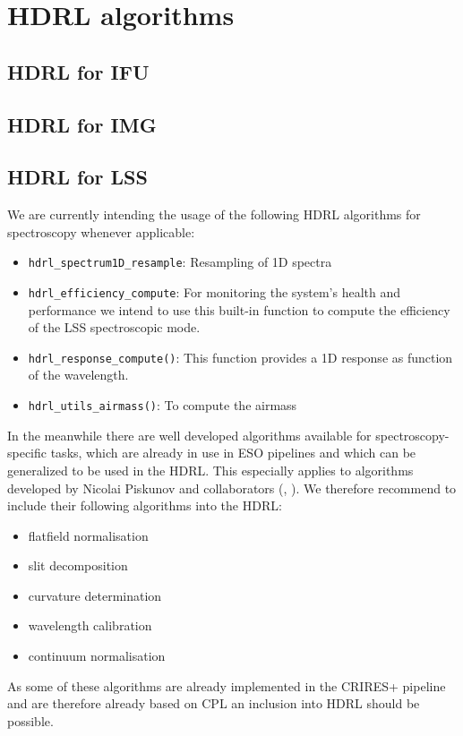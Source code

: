 \clearpage
\section{HDRL algorithms}\label{sec:hdrl_algorithms}
\subsection{HDRL for IFU}\label{ssec:hdrllms}


\subsection{HDRL for IMG}\label{ssec:hdrlimg}



\subsection{HDRL for LSS}\label{ssec:hdrllss}
We are currently intending the usage of the following \ac{HDRL} algorithms for spectroscopy whenever applicable:
\begin{itemize}
    \item \texttt{hdrl\_spectrum1D\_resample}: Resampling of 1D spectra
    \item \texttt{hdrl\_efficiency\_compute}: For monitoring the system's health and performance we intend to use this built-in function to compute the efficiency of the \ac{LSS} spectroscopic mode.
    \item \texttt{hdrl\_response\_compute()}: This function provides a 1D response as function of the wavelength. 
    \item \texttt{hdrl\_utils\_airmass()}: To compute the airmass
\end{itemize}

In the meanwhile there are well developed algorithms available for spectroscopy-specific tasks, which are already in use in ESO pipelines and which can be generalized to be used in the \ac{HDRL}. This especially applies to algorithms developed by Nicolai Piskunov and collaborators (\cite{pis21}, \cite{pis02}). We therefore recommend to include their following algorithms into the \ac{HDRL}:
\begin{itemize}
    \item flatfield normalisation
    \item slit decomposition
    \item curvature determination
    \item wavelength calibration
    \item continuum normalisation
\end{itemize}
As some of these algorithms are already implemented in the CRIRES+ pipeline and are therefore already based on \ac{CPL} an inclusion into \ac{HDRL} should be possible.
